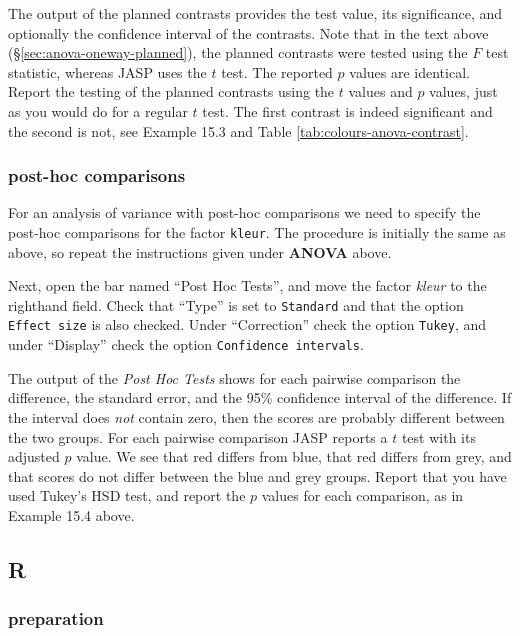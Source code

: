 \documentclass[
]{book}
\begin{document}
The output of the planned contrasts provides the test value, its significance, and optionally the confidence interval of the contrasts. Note that in the text above (§\ref{sec:anova-oneway-planned}), the planned contrasts were tested using the \(F\) test statistic, whereas JASP uses the \(t\) test. The reported \(p\) values are identical. Report the testing of the planned contrasts using the \(t\) values and \(p\) values, just as you would do for a regular \(t\) test.
The first contrast is indeed significant and the second is not, see Example 15.3 and Table \ref{tab:colours-anova-contrast}.

\hypertarget{post-hoc-comparisons}{%
\subsubsection{post-hoc comparisons}\label{post-hoc-comparisons}}

For an analysis of variance with post-hoc comparisons we need to specify the post-hoc comparisons for the factor \texttt{kleur}. The procedure is initially the same as above, so repeat the instructions given under \textbf{ANOVA} above.

Next, open the bar named ``Post Hoc Tests'', and move the factor \emph{kleur} to the righthand field.
Check that ``Type'' is set to \texttt{Standard} and that the option \texttt{Effect\ size} is also checked.
Under ``Correction'' check the option \texttt{Tukey}, and under ``Display'' check the option \texttt{Confidence\ intervals}.

The output of the \emph{Post Hoc Tests} shows for each pairwise comparison the difference, the standard error, and the 95\% confidence interval of the difference. If the interval does \emph{not} contain zero, then the scores are probably different between the two groups. For each pairwise comparison JASP reports a \(t\) test with its adjusted \(p\) value. We see that red differs from blue, that red differs from grey, and that scores do not differ between the blue and grey groups. Report that you have used Tukey's HSD test, and report the \(p\) values for each comparison, as in Example 15.4 above.

\hypertarget{r-15}{%
\subsection{R}\label{r-15}}

\hypertarget{preparation-3}{%
\subsubsection{preparation}\label{preparation-3}}
\end{document}

